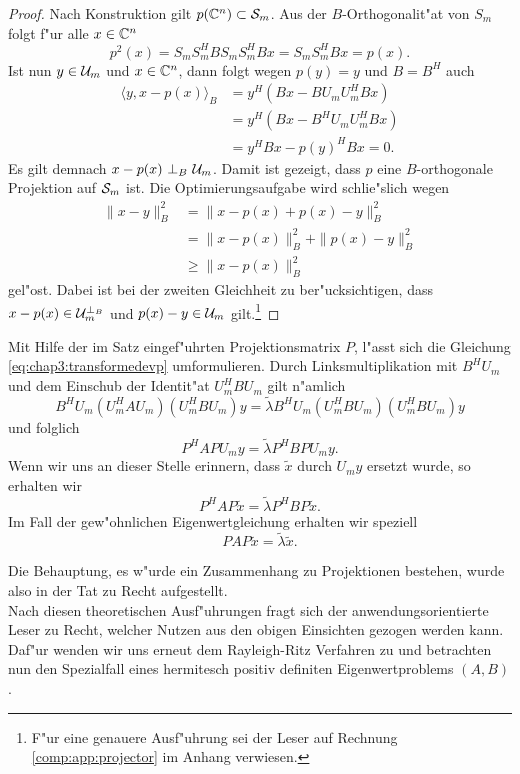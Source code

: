 \begin{proof}
Nach Konstruktion gilt $p(\Cn)\subset \S_m$. Aus der $B$-Orthogonalit"at von $S_m$ folgt f"ur alle $x\in\Cn$
\[
p^2 (x) = S_m S_m^H B S_m S_m^H B x= S_m S_m^H Bx = p(x).
\]
Ist nun $y\in\U_m$ und $x\in\Cn$, dann folgt wegen $p(y) = y$ und $B=B^H$ auch
\begin{align*}
\langle y, x-p(x)\rangle_B &= y^H (Bx - B U_m U_m^H Bx) \\
&= y^H (Bx - B^H U_m U_m^H Bx) \\
&= y^H Bx - p(y)^H Bx = 0.
\end{align*}
Es gilt demnach $x-p(x) \ \bot_B \ \U_m$. Damit ist gezeigt, dass $p$ eine $B$-orthogonale Projektion auf $\S_m$ ist. Die Optimierungsaufgabe wird schlie"slich wegen
\begin{align*}
\|x-y\|_B^2 &= \|x-p(x) + p(x)-y\|_B^2 \\
&= \|x-p(x)\|_B^2 + \|p(x)-y\|_B^2\\
&\ge \|x-p(x)\|_B^2
\end{align*}
gel"ost. Dabei ist bei der zweiten Gleichheit zu ber"ucksichtigen, dass $x-p(x) \in \U_m^{\bot_B}$
und $p(x)-y \in \U_m$ gilt.\footnote{F"ur eine genauere Ausf"uhrung sei der Leser auf Rechnung \ref{comp:app:projector} im Anhang verwiesen.}
\end{proof}

Mit Hilfe der im Satz eingef"uhrten Projektionsmatrix $P$, l"asst sich die Gleichung
\eqref{eq:chap3:transformedevp} umformulieren. Durch Linksmultiplikation
mit $B^H U_m$ und dem Einschub der Identit"at $U_m^H B U_m$ gilt n"amlich
\[
B^H U_m (U_m^H A U_m)(U_m^H B U_m)y = \widetilde{\lambda} B^H U_m (U_m^H B U_m)(U_m^H B U_m)y
\]
und folglich
\[
P^H A P U_m y = \widetilde{\lambda} P^H B P U_m y.
\]
Wenn wir uns an dieser Stelle erinnern, dass $\widetilde{x}$ durch $U_m y$ ersetzt wurde, so
erhalten wir
\[
P^H A P \widetilde{x} = \widetilde{\lambda} P^H B P \widetilde{x}.
\]
Im Fall der gew"ohnlichen Eigenwertgleichung erhalten wir speziell
\[
P A P \widetilde{x} = \widetilde{\lambda} \widetilde{x}.
\]

Die Behauptung, es w"urde ein Zusammenhang zu Projektionen bestehen, wurde also in der Tat zu Recht aufgestellt.\\

Nach diesen theoretischen Ausf"uhrungen fragt sich der anwendungsorientierte Leser zu Recht, welcher Nutzen aus den obigen Einsichten gezogen werden kann.
Daf"ur wenden wir uns erneut dem Rayleigh-Ritz Verfahren zu und betrachten nun den Spezialfall eines hermitesch positiv definiten Eigenwertproblems $(A,B)$.

